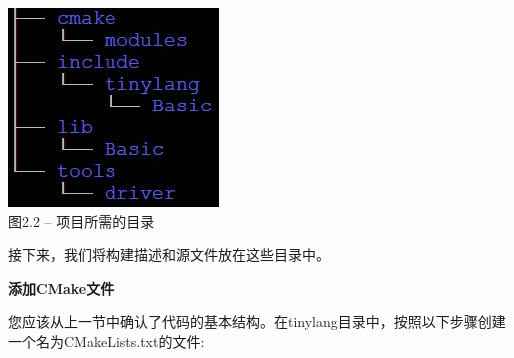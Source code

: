 \hspace*{\fill} \par %
\begin{center}
	\includegraphics{content/1/chapter2/images/2.jpg}\\
	图2.2 – 项目所需的目录
\end{center}

接下来，我们将构建描述和源文件放在这些目录中。\par

\hspace*{\fill} \par %
\textbf{添加CMake文件}

您应该从上一节中确认了代码的基本结构。在tinylang目录中，按照以下步骤创建一个名为CMakeLists.txt的文件:\par

